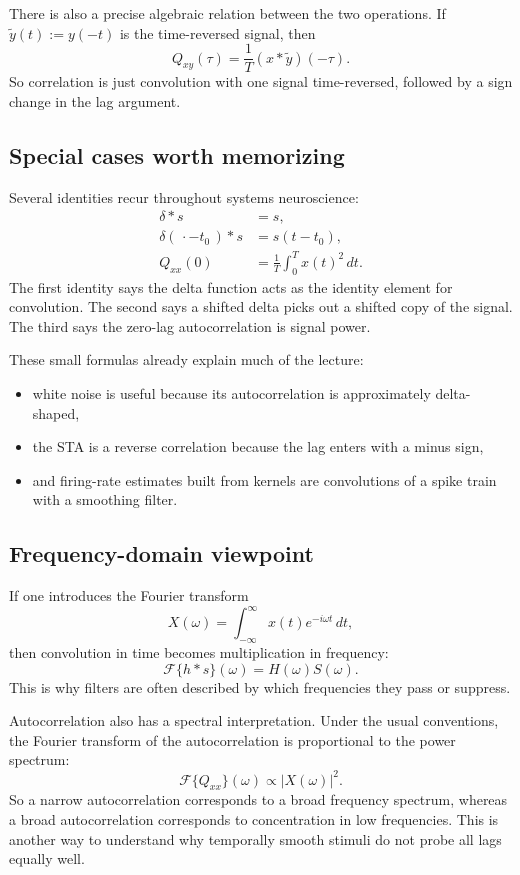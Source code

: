 \documentclass[11pt]{article}
\begin{document}
There is also a precise algebraic relation between the two operations. If $\tilde{y}(t):=y(-t)$ is the time-reversed signal, then
\[
Q_{xy}(\tau)=\frac{1}{T}(x * \tilde{y})(-\tau).
\]
So correlation is just convolution with one signal time-reversed, followed by a sign change in the lag argument.

\subsection{Special cases worth memorizing}

Several identities recur throughout systems neuroscience:
\begin{align*}
\delta * s &= s,\\
\delta(\,\cdot - t_0\,) * s &= s(t-t_0),\\
Q_{xx}(0) &= \frac{1}{T}\int_0^T x(t)^2\,dt.
\end{align*}
The first identity says the delta function acts as the identity element for convolution. The second says a shifted delta picks out a shifted copy of the signal. The third says the zero-lag autocorrelation is signal power.

These small formulas already explain much of the lecture:
\begin{itemize}
    \item white noise is useful because its autocorrelation is approximately delta-shaped,
    \item the STA is a reverse correlation because the lag enters with a minus sign,
    \item and firing-rate estimates built from kernels are convolutions of a spike train with a smoothing filter.
\end{itemize}

\subsection{Frequency-domain viewpoint}

If one introduces the Fourier transform
\[
X(\omega)=\int_{-\infty}^{\infty} x(t)e^{-i\omega t}\,dt,
\]
then convolution in time becomes multiplication in frequency:
\[
\mathcal{F}\{h*s\}(\omega)=H(\omega)S(\omega).
\]
This is why filters are often described by which frequencies they pass or suppress.

Autocorrelation also has a spectral interpretation. Under the usual conventions, the Fourier transform of the autocorrelation is proportional to the power spectrum:
\[
\mathcal{F}\{Q_{xx}\}(\omega)\propto |X(\omega)|^2.
\]
So a narrow autocorrelation corresponds to a broad frequency spectrum, whereas a broad autocorrelation corresponds to concentration in low frequencies. This is another way to understand why temporally smooth stimuli do not probe all lags equally well.
\end{document}
